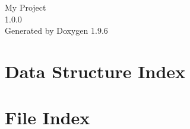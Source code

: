 \documentclass[twoside]{book}
\newcommand{\+}{\discretionary{\mbox{\scriptsize$\hookleftarrow$}}{}{}}
\newcommand{\clearemptydoublepage}{%
    \newpage{\pagestyle{empty}\cleardoublepage}%
  }
\begin{document}
  \raggedbottom
    \hypersetup{pageanchor=false,
                bookmarksnumbered=true,
                pdfencoding=unicode
               }
  \begin{titlepage}
  \vspace*{7cm}
  \begin{center}%
  {\Large My Project}\\
  [1ex]\large 1.\+0.\+0 \\
  \vspace*{1cm}
  {\large Generated by Doxygen 1.9.6}\\
  \end{center}
  \end{titlepage}
  \clearemptydoublepage
  \tableofcontents
  \clearemptydoublepage
  \hypersetup{pageanchor=true}
\chapter{Data Structure Index}

\chapter{File Index}

\end{document}

